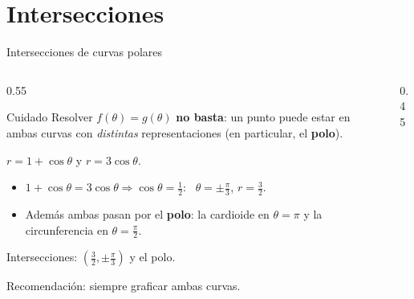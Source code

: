 \documentclass[10pt,aspectratio=169]{beamer}
\begin{document}
\section{Intersecciones}

\begin{frame}{Intersecciones de curvas polares}
  \begin{columns}
    \begin{column}{0.55\textwidth}
      \begin{block}{Cuidado}
        Resolver $f(\theta)=g(\theta)$ \textbf{no basta}: un punto puede estar en ambas curvas con \emph{distintas} representaciones
        (en particular, el \textbf{polo}).
      \end{block}
      \begin{ejemplo}[6]
        $r=1+\cos\theta$ y $r=3\cos\theta$.
        \begin{itemize}
          \item $1+\cos\theta=3\cos\theta\Rightarrow\cos\theta=\frac12$: \ $\theta=\pm\frac\pi3$, $r=\frac32$.
          \item Además ambas pasan por el \textbf{polo}: la cardioide en $\theta=\pi$ y la circunferencia en $\theta=\frac\pi2$.
        \end{itemize}
        Intersecciones: $\left(\frac32,\pm\frac\pi3\right)$ y el polo.
      \end{ejemplo}
      \small Recomendación: siempre graficar ambas curvas.
    \end{column}
    \begin{column}{0.45\textwidth}
      \centering
    \end{column}
  \end{columns}
\end{frame}
\end{document}

